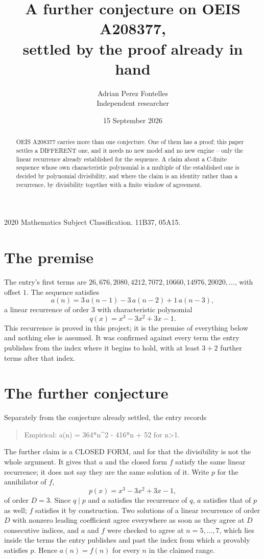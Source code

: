 \documentclass[11pt,a4paper]{article}
\title{A further conjecture on OEIS A208377,\\ \large settled by the proof already in hand}
\author{Adrian Perez Fontelles\\ \small Independent researcher}
\date{15 September 2026}
\theoremstyle{plain}
\theoremstyle{definition}
\begin{document}
\maketitle

\begin{abstract}
OEIS A208377 carries more than one conjecture. One of them has a proof; this paper settles a
DIFFERENT one, and it needs no new model and no new engine -- only the linear recurrence already
established for the sequence. A claim about a C-finite sequence whose own characteristic
polynomial is a multiple of the established one is decided by polynomial divisibility, and where
the claim is an identity rather than a recurrence, by divisibility together with a finite window
of agreement.
\end{abstract}

\noindent\small 2020 Mathematics Subject Classification. 11B37, 05A15.\normalsize

\section{The premise}

The entry's first terms are $26, 676, 2080, 4212, 7072, 10660, 14976, 20020,\dots$, with offset $1$. The sequence satisfies
\[
  a(n)=3\,a(n-1) - 3\,a(n-2) + 1\,a(n-3) ,
\]
a linear recurrence of order $3$ with characteristic polynomial
\[
  q(x)=x^{3} - 3 x^{2} + 3 x - 1 .
\]
This recurrence is proved in this project; it is the premise of everything below and nothing else is assumed.
It was confirmed against every term the entry publishes from the index where it begins to hold,
with at least $3+2$ further terms after that index.

\section{The further conjecture}

Separately from the conjecture already settled, the entry records

\begin{quote}\raggedright Empirical: a(n) = 364*n\^{}2 - 416*n + 52 for n>1.\end{quote}

The further claim is a CLOSED FORM, and for that the divisibility is not the whole argument. It
gives that $a$ and the closed form $f$ satisfy the same linear recurrence; it does not say they
are the same solution of it. Write $p$ for the annihilator of $f$,
\[
  p(x)=x^{3} - 3 x^{2} + 3 x - 1 ,
\]
of order $D=3$. Since $q\mid p$ and $a$ satisfies the recurrence of $q$, $a$ satisfies that of
$p$ as well; $f$ satisfies it by construction. Two solutions of a linear recurrence of order $D$
with nonzero leading coefficient agree everywhere as soon as they agree at $D$ consecutive
indices, and $a$ and $f$ were checked to agree at $n=5,\dots,7$,
which lies inside the terms the entry publishes and past the index from which $a$ provably
satisfies $p$. Hence $a(n)=f(n)$ for every $n$ in the claimed range.
\end{document}
